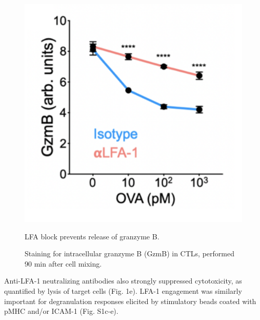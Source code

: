 \begin{figure}[htbp]
	\centering
	\includegraphics[width=0.6\columnwidth]{../figures/chapter3/fig1gzmb.png}
	\caption{LFA block prevents release of granzyme B.}
	\caption*{Staining for intracellular granzyme B (GzmB) in CTLs, performed 90 min after cell mixing.}
	\label{fig:fig1gzmb}
\end{figure} 

Anti-LFA-1 neutralizing antibodies also strongly suppressed cytotoxicity, as quantified by lysis of target cells (Fig. 1e).  LFA-1 engagement was similarly important for degranulation responses elicited by stimulatory beads coated with pMHC and/or ICAM-1 (Fig. S1c-e). 

